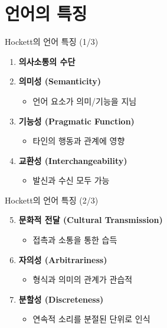 \documentclass[aspectratio=169]{beamer}
\begin{document}
\section{언어의 특징}

\begin{frame}{Hockett의 언어 특징 (1/3)}
\begin{enumerate}
\item \textbf{의사소통의 수단}
\item \textbf{의미성 (Semanticity)}
    \begin{itemize}
    \item 언어 요소가 의미/기능을 지님
    \end{itemize}
\item \textbf{기능성 (Pragmatic Function)}
    \begin{itemize}
    \item 타인의 행동과 관계에 영향
    \end{itemize}
\item \textbf{교환성 (Interchangeability)}
    \begin{itemize}
    \item 발신과 수신 모두 가능
    \end{itemize}
\end{enumerate}
\end{frame}

\begin{frame}{Hockett의 언어 특징 (2/3)}
\begin{enumerate}
\setcounter{enumi}{4}
\item \textbf{문화적 전달 (Cultural Transmission)}
    \begin{itemize}
    \item 접촉과 소통을 통한 습득
    \end{itemize}
\item \textbf{자의성 (Arbitrariness)}
    \begin{itemize}
    \item 형식과 의미의 관계가 관습적
    \end{itemize}
\item \textbf{분할성 (Discreteness)}
    \begin{itemize}
    \item 연속적 소리를 분절된 단위로 인식
    \end{itemize}
\end{enumerate}
\end{frame}
\end{document}
